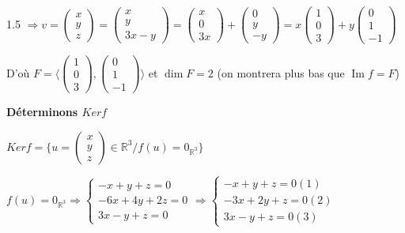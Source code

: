 \documentclass[12pt]{article}
\begin{document}
\begin{spacing}{1.5}
$\Rightarrow v=\begin{pmatrix}
x\\
y\\
z
\end{pmatrix}=\begin{pmatrix}
x\\
y\\
3x-y
\end{pmatrix}=\begin{pmatrix}
x\\
0\\
3x
\end{pmatrix}+\begin{pmatrix}
0\\
y\\
-y
\end{pmatrix}=x\begin{pmatrix}
1\\
0\\
3
\end{pmatrix}+y\begin{pmatrix}
0\\
1\\
-1
\end{pmatrix}$

D'où $F=\langle \begin{pmatrix}
1\\
0\\
3
\end{pmatrix},\begin{pmatrix}
0 \\
1 \\
-1
\end{pmatrix}\rangle$ et $\dim F=2$ (on montrera plus bas que $\operatorname{Im}f=F$)

\medskip
\textbf{Déterminons $Kerf$}

$Kerf=\{u=\begin{pmatrix}
x\\
y\\
z
\end{pmatrix}\in \mathbb{R}^3/f(u)=0_{\mathbb{R}^3}\}$

$f(u)=0_{\mathbb{R}^3}\Rightarrow \begin{cases}
-x+y+z=0\\
-6x+4y+2z=0\\
3x-y+z=0
\end{cases}\Rightarrow \begin{cases}
-x+y+z=0(1)\\
-3x+2y+z=0(2)\\
3x-y+z=0(3)
\end{cases}$


\end{spacing}
\end{document}
